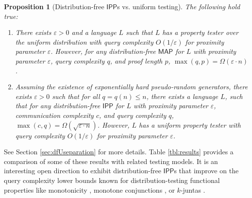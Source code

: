 \documentclass[10pt,a4paper]{article}
\newtheorem{proposition}[theorem]{Proposition}
\newcommand{\IPP}{\mathsf{IPP}}
\newcommand{\MAP}{\mathsf{MAP}}
\newcommand{\eps}{\varepsilon}
\begin{document}
\begin{proposition}[Distribution-free $\IPP$s vs. uniform testing]
\label{prop:seps}
    The following hold true:
    \begin{enumerate}
        \item There exists $\varepsilon>0$ and a language $L$ such that $L$ has a property tester over the uniform distribution with query complexity $O(1/\varepsilon)$ for proximity parameter $\varepsilon$. However, for any distribution-free $\MAP$ for $L$ with proximity parameter $\eps$, query complexity $q$, and proof length $p$, $\max(q,p)=\Omega(\varepsilon\cdot n)$. 
        
        \item Assuming the existence of exponentially hard pseudo-random generators, there exists $\varepsilon>0$ such that for all $q=q(n)\leq n$, there exists a language $L$, such that for any distribution-free $\IPP$ for $L$ with proximity parameter $\eps$, communication complexity $c$, and query complexity $q$, $\max(c,q)=\Omega(\sqrt{\varepsilon\cdot n})$. 
        However, $L$ has a uniform property tester with query complexity $O(1/\varepsilon)$ for proximity parameter $\eps$.
        \end{enumerate}
\end{proposition}

See Section \ref{sec:dfUseparation} for more details. Table \ref{tbl:results} provides a comparison of some of these results with related testing models. It is an interesting open direction to exhibit distribution-free $\IPP$s that improve on the query complexity lower bounds known for distribution-testing functional properties like monotonicity \cite{HalKush}, monotone conjunctions \cite{ChenXie}, or $k$-juntas \cite{Junta}.
\end{document}
